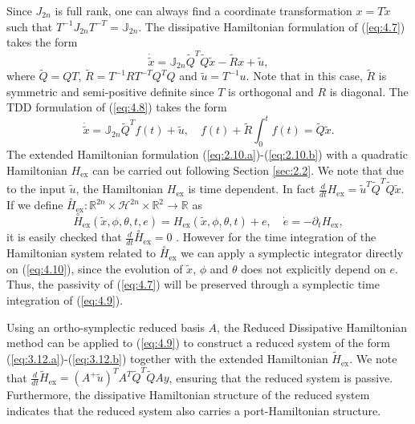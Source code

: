 Since $J_{2n}$ is full rank, one can always find a coordinate transformation $ x= T \tilde x$ such that $T^{-1} J_{2n} T^{-T} = \mathbb J_{2n}$. The dissipative Hamiltonian formulation of (\ref{eq:4.7}) takes the form
\begin{equation} \label{eq:4.8}
	\dot {\tilde x} = \mathbb J_{2n} \tilde Q^T\tilde Q \tilde x - \tilde Rx + \tilde u,
\end{equation}
where $\tilde Q = QT$, $\tilde R = T^{-1}RT^{-T}Q^TQ$ and $\tilde u = T^{-1} u$. Note that in this case, $\tilde R$ is symmetric and semi-positive definite since $T$ is orthogonal and $R$ is diagonal. The TDD formulation of (\ref{eq:4.8}) takes the form
\begin{equation} \label{eq:4.9}
	\dot{\tilde x} = \mathbb{J}_{2n} \tilde Q^T f(t) + \tilde u, \quad f(t) + \tilde R \int_0^t f(t) = \tilde Q \tilde x.
\end{equation}
The extended Hamiltonian formulation (\ref{eq:2.10.a})-(\ref{eq:2.10.b}) with a quadratic Hamiltonian $H_{\text{ex}}$ can be carried out following Section \ref{sec:2.2}. We note that due to the input $\tilde u$, the Hamiltonian $H_{\text{ex}}$ is time dependent. In fact $\frac{d}{dt} H_{\text{ex}} = \tilde u^T\tilde Q^T \tilde Q \tilde x$. If we define $\overset{\circ}{H}_{\text{ex}} : \mathbb R^{2n}\times \mathcal H^{2n}\times \mathbb R^{2}\to \mathbb R$ as
\begin{equation} \label{eq:4.10}
	\overset{\circ}{H}_{\text{ex}}(\tilde x,\phi,\theta,t,e) = H_{\text{ex}}(\tilde x,\phi,\theta,t) + e, \quad \dot e = - \partial_t H_{\text{ex}},
\end{equation}
it is easily checked that $\frac d {dt} \overset{\circ}{H}_{\text{ex}} =0$ \cite{Hairer:1250576}. However for the time integration of the Hamiltonian system related to $\overset{\circ}{H}_{\text{ex}}$ we can apply a symplectic integrator directly on (\ref{eq:4.10}), since the evolution of $\tilde x$, $\phi$ and $\theta$ does not explicitly depend on $e$. Thus, the passivity of (\ref{eq:4.7}) will be preserved through a symplectic time integration of (\ref{eq:4.9}).

Using an ortho-symplectic reduced basis $A$, the Reduced Dissipative Hamiltonian method can be applied to (\ref{eq:4.9}) to construct a reduced system of the form (\ref{eq:3.12.a})-(\ref{eq:3.12.b}) together with the extended Hamiltonian $\tilde H_{\text{ex}}$. We note that $\frac{d}{dt} \tilde H_{\text{ex}} = (A^+ \tilde u)^T A^T \tilde Q^T \tilde Q A y$, ensuring that the reduced system is passive. Furthermore, the dissipative Hamiltonian structure of the reduced system indicates that the reduced system also carries a port-Hamiltonian structure.

